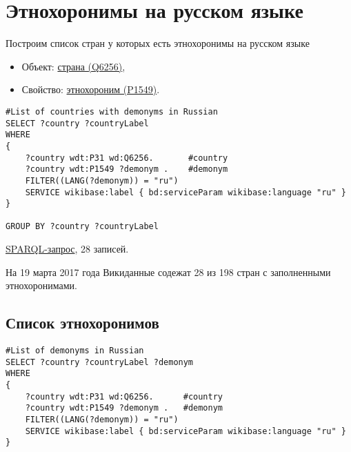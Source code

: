 \section{Этнохоронимы на русском языке}

Построим список стран у которых есть этнохоронимы на русском языке

\begin{itemize}
    \item Объект: \href{https://www.wikidata.org/wiki/Q6256}{страна (Q6256)},
    \item Свойство: \href{https://www.wikidata.org/wiki/Property:P1549}{этнохороним (P1549)}.
\end{itemize}


\begin{lstlisting}[language=SPARQL]
#List of countries with demonyms in Russian
SELECT ?country ?countryLabel 
WHERE
{
	?country wdt:P31 wd:Q6256.       #country
	?country wdt:P1549 ?demonym .    #demonym
	FILTER((LANG(?demonym)) = "ru")
	SERVICE wikibase:label { bd:serviceParam wikibase:language "ru" }
}

GROUP BY ?country ?countryLabel
\end{lstlisting}

\href{https://query.wikidata.org/#%23List%20of%20countries%20with%20demonym%20on%20russian%20language%0ASELECT%20%3Fcountry%20%3FcountryLabel%20%0AWHERE%0A%7B%0A%09%3Fcountry%20wdt%3AP31%20wd%3AQ6256.%20%20%20%20%20%20%20%23country%0A%09%3Fcountry%20wdt%3AP1549%20%3Fdemonym%20.%20%20%20%20%23demonym%0A%09FILTER%28%28LANG%28%3Fdemonym%29%29%20%3D%20%22ru%22%29%0A%09SERVICE%20wikibase%3Alabel%20%7B%20bd%3AserviceParam%20wikibase%3Alanguage%20%22ru%22%20%7D%0A%7D%0A%0AGROUP%20BY%20%3Fcountry%20%3FcountryLabel}{SPARQL-запрос}, 28 записей.

На 19 марта 2017 года Викиданные содежат 28 из 198 стран с заполненными этнохоронимами.

\subsection{Список этнохоронимов}



\begin{lstlisting}[language=SPARQL]
#List of demonyms in Russian
SELECT ?country ?countryLabel ?demonym
WHERE
{
	?country wdt:P31 wd:Q6256.      #country
	?country wdt:P1549 ?demonym .   #demonym
	FILTER((LANG(?demonym)) = "ru")
	SERVICE wikibase:label { bd:serviceParam wikibase:language "ru" }
}
\end{lstlisting}

